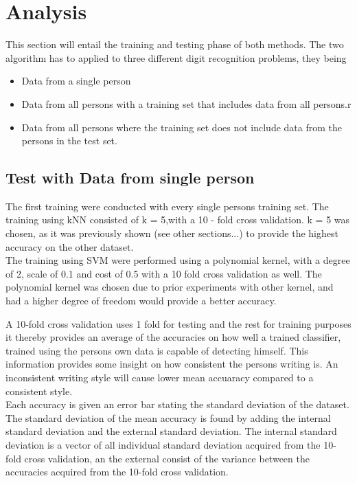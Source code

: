 \section{Analysis}
This section will entail the training and testing phase of both methods. The two 
algorithm has to applied to three different digit recognition problems, they 
being 
\begin{itemize}
\item	Data from a single person
\item	Data from all persons with a training set that includes data from all 
persons.r
\item Data from all persons where the training set does not include data from 
the persons in the test set.
\end{itemize}

\subsection{Test with Data from single person}
\label{sec::test_with_data_from_single_person}

The first training were conducted with every single persons training set. The 
training using kNN consisted of k = 5,with a 10 - fold cross validation. k = 5 
was chosen, as it was previously shown (see other sections...) to provide the highest accuracy on the other dataset. \\

The training using SVM were performed using a polynomial kernel, with a degree 
of 2, scale of 0.1   and cost of 0.5 with a 10 fold cross validation as well. 
The polynomial kernel was chosen due to prior experiments with other kernel, and 
had a higher degree of freedom would provide a better accuracy.\\ 

 
A
10-fold cross validation uses 1 fold for testing and the rest for training 
purposes it thereby provides an average of the accuracies on how well a trained 
classifier, trained using the persons own data is capable of detecting himself.  
This information provides some insight on how consistent the persons writing is. 
An inconsistent writing style will cause lower mean accuaracy compared to a 
consistent style. \\

 Each accuracy is given an error bar stating the standard deviation of the 
dataset. The standard deviation of the mean accuracy is found by adding the 
internal standard deviation and the external standard deviation. The internal 
standard deviation is a vector of all individual standard deviation acquired 
from the 10-fold cross validation, an the external consist of the variance 
between the accuracies acquired  from the 10-fold cross validation. 
 
